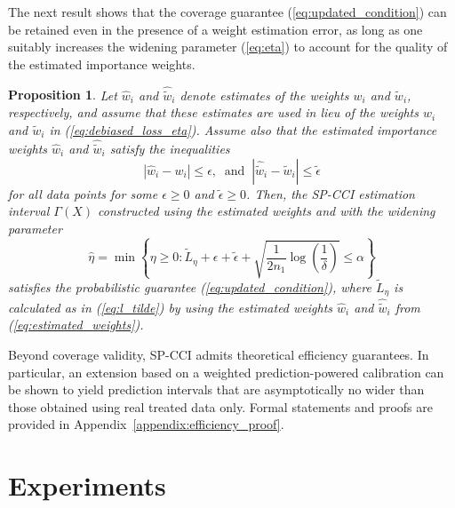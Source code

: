 \documentclass{article}
\theoremstyle{plain}
\newtheorem{proposition}[theorem]{Proposition}
\theoremstyle{definition}
\theoremstyle{remark}
\begin{document}
The next result shows that the coverage guarantee (\ref{eq:updated_condition}) can be retained even in the presence of a weight estimation error, as long as one suitably increases the widening parameter (\ref{eq:eta}) to account for the quality of the estimated importance weights.



\begin{proposition}
\label{prop:2}
Let $\hat{w}_i$ and $\hat{\tilde{w}}_i$ denote estimates of the weights $w_i$ and $\tilde{w}_i$, respectively, and assume that these estimates are used in lieu of the weights $w_i$ and $\tilde{w}_i$ in (\ref{eq:debiased_loss_eta}). Assume also that the estimated importance weights \( \hat{w}_i \) and \( \hat{\tilde{w}}_i \) satisfy the inequalities
\begin{equation}
\label{eq:estimated_weights}
 | \hat{w}_i - w_i | \leq \epsilon,\;\;\text{and}\;\; | \hat{\tilde{w}}_i - \tilde{w}_i | \leq \tilde{\epsilon}
\end{equation}
for all data points for some $\epsilon\geq 0$ and $\tilde{\epsilon}\geq 0$. Then, the SP-CCI estimation interval \( \Gamma(X) \) constructed using the estimated weights and with the widening parameter
\begin{equation}
\label{eq:new_choice}
\hat{\eta} = \min\left\{ \eta \geq 0 :\tilde{L}_\eta + \epsilon + \tilde{\epsilon}+ \sqrt{\frac{1}{2n_1} \log\left( \frac{1}{\delta} \right)} \leq \alpha\right\}
\end{equation}
satisfies the probabilistic guarantee (\ref{eq:updated_condition}), where $\tilde{L}_\eta$ is calculated as in (\ref{eq:l_tilde}) by using the estimated weights $\hat{w}_i$ and $\hat{\tilde{w}}_i$ from (\ref{eq:estimated_weights}).
\end{proposition}




Beyond coverage validity, SP-CCI admits theoretical efficiency guarantees.
In particular, an extension based on a weighted prediction-powered calibration
can be shown to yield prediction intervals that are asymptotically no wider
than those obtained using real treated data only.
Formal statements and proofs are provided in Appendix~\ref{appendix:efficiency_proof}.



\section{Experiments}
\label{sec:experiments}
\end{document}
